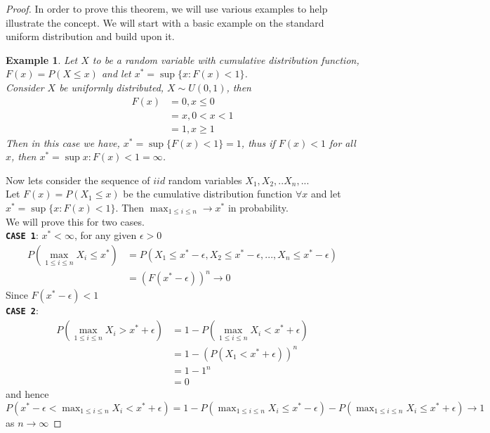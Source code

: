 \documentclass[11pt,a4paper]{article}
\theoremstyle{plain}
\newtheorem{exmp}[fact]{Example}
\begin{document}
\begin{proof}
In order to prove this theorem, we will use various examples to help illustrate the concept. We will start with a basic example on the standard uniform distribution and build upon it.
\begin{exmp}
Let $X$ to be a random variable with cumulative distribution function, $F(x)=P(X \leq x)$ and let $x^*=\sup\{x:F(x)<1\}$.\\
Consider $X$ be uniformly distributed, $X \sim U(0,1)$, then
 \begin{equation*} 
\begin{split}
     F(x) & = 0 ,x \leq 0\\
            & = x , 0<x<1 \\
            & = 1 ,x \geq 1
 \end{split}
\end{equation*}        
Then in this case we have, $x^*=\sup\{F(x)<1\}=1$, thus if $F(x)<1$ for all $x$, then $x^*=\sup{x:F(x)<1}=\infty$.
\end{exmp}
Now lets consider the sequence of $iid$ random variables $X_1,X_2,..X_n,..$.\\
Let $F(x)=P(X_1 \leq x)$ be the cumulative distribution function  $\forall x$ and let $x^*=\sup\{x:F(x)<1\}$. Then $\max_{1 \leq i \leq n } \rightarrow x^*$ in probability. \\
We will prove this for two cases.\\
\textbf{\texttt{CASE 1}}: $x^* < \infty$, for any given $\epsilon >0$ \\
 \begin{equation*} 
\begin{split}
     P(\max_{1 \leq i \leq n }X_i \leq x^*) & = P(X_1 \leq x^*-\epsilon, X_2 \leq x^*-\epsilon,...,X_n \leq x^*-\epsilon )\\
                 & = (F(x^*-\epsilon))^n \rightarrow 0 
\end{split}
\end{equation*}  
Since $F(x^*-\epsilon)<1$\\ 
\textbf{\texttt{CASE 2}}:\\    
 \begin{equation*} 
\begin{split}
P(\max_{1 \leq i \leq n }X_i > x^* + \epsilon) & = 1- P(\max_{1 \leq i \leq n }X_i < x^* + \epsilon)\\
                & = 1-(P(X_1 < x^* + \epsilon))^n\\
                & = 1-1^n\\
                &=  0
\end{split}
\end{equation*}  
and hence\\
$P(x^*-\epsilon < \max_{1 \leq i \leq n}X_i < x^*+\epsilon)=1-P(\max_{1 \leq i \leq n}X_i \leq x^*-\epsilon)-P(\max_{1 \leq i \leq n}X_i \leq x^*+\epsilon) \rightarrow 1$ \\
as $n \rightarrow \infty$ 


\end{proof}
\end{document}
